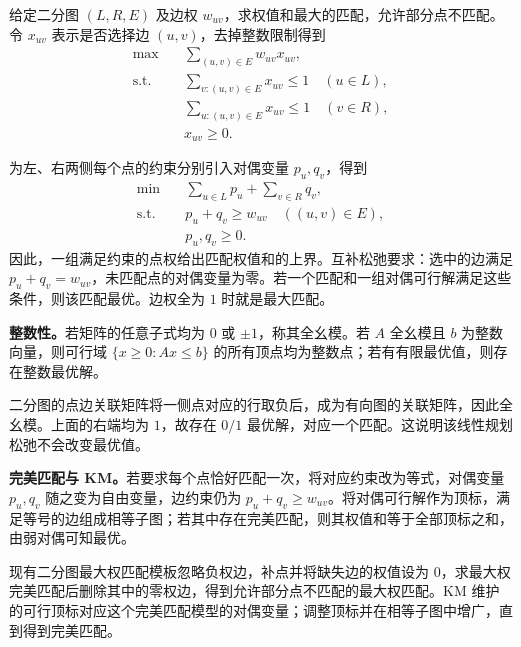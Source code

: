 给定二分图 $(L,R,E)$ 及边权 $w_{uv}$，求权值和最大的匹配，允许部分点不匹配。令 $x_{uv}$ 表示是否选择边 $(u,v)$，去掉整数限制得到
\[
\begin{aligned}
\max\quad &\sum_{(u,v)\in E}w_{uv}x_{uv},\\
\text{s.t.}\quad &\sum_{v:(u,v)\in E}x_{uv}\le1\quad(u\in L),\\
&\sum_{u:(u,v)\in E}x_{uv}\le1\quad(v\in R),\\
&x_{uv}\ge0.
\end{aligned}
\]

为左、右两侧每个点的约束分别引入对偶变量 $p_u,q_v$，得到
\[
\begin{aligned}
\min\quad &\sum_{u\in L}p_u+\sum_{v\in R}q_v,\\
\text{s.t.}\quad &p_u+q_v\ge w_{uv}\quad((u,v)\in E),\\
&p_u,q_v\ge0.
\end{aligned}
\]
因此，一组满足约束的点权给出匹配权值和的上界。互补松弛要求：选中的边满足 $p_u+q_v=w_{uv}$，未匹配点的对偶变量为零。若一个匹配和一组对偶可行解满足这些条件，则该匹配最优。边权全为 $1$ 时就是最大匹配。

\textbf{整数性。}若矩阵的任意子式均为 $0$ 或 $\pm1$，称其全幺模。若 $A$ 全幺模且 $b$ 为整数向量，则可行域 $\{x\ge0:Ax\le b\}$ 的所有顶点均为整数点；若有有限最优值，则存在整数最优解。

二分图的点边关联矩阵将一侧点对应的行取负后，成为有向图的关联矩阵，因此全幺模。上面的右端均为 $1$，故存在 $0/1$ 最优解，对应一个匹配。这说明该线性规划松弛不会改变最优值。

\textbf{完美匹配与 KM。}若要求每个点恰好匹配一次，将对应约束改为等式，对偶变量 $p_u,q_v$ 随之变为自由变量，边约束仍为 $p_u+q_v\ge w_{uv}$。将对偶可行解作为顶标，满足等号的边组成相等子图；若其中存在完美匹配，则其权值和等于全部顶标之和，由弱对偶可知最优。

现有二分图最大权匹配模板忽略负权边，补点并将缺失边的权值设为 $0$，求最大权完美匹配后删除其中的零权边，得到允许部分点不匹配的最大权匹配。KM 维护的可行顶标对应这个完美匹配模型的对偶变量；调整顶标并在相等子图中增广，直到得到完美匹配。
